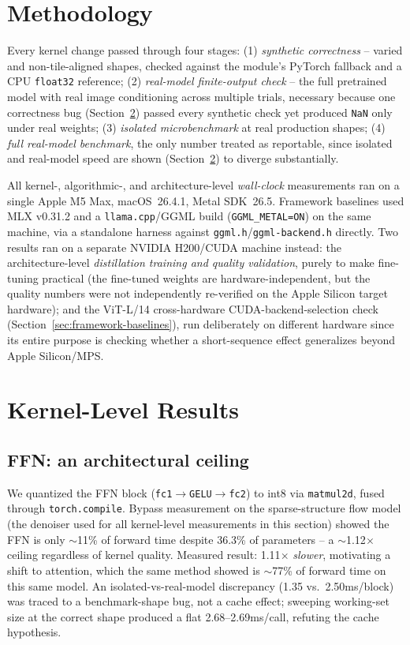 \documentclass{article}
\newcommand{\code}[1]{\texttt{#1}}
\begin{document}
\section{Methodology}

Every kernel change passed through four stages: (1) \emph{synthetic correctness} -- varied and
non-tile-aligned shapes, checked against the module's PyTorch fallback and a CPU \code{float32}
reference; (2) \emph{real-model finite-output check} -- the full pretrained model with real image
conditioning across multiple trials, necessary because one correctness bug
(Section~\ref{sec:ffn}) passed every synthetic check yet produced \code{NaN} only under real
weights; (3) \emph{isolated microbenchmark} at real production shapes; (4) \emph{full real-model
benchmark}, the only number treated as reportable, since isolated and real-model speed are shown
(Section~\ref{sec:ffn}) to diverge substantially.

All kernel-, algorithmic-, and architecture-level \emph{wall-clock} measurements ran on a single
Apple M5 Max, macOS~26.4.1, Metal SDK~26.5. Framework baselines used MLX v0.31.2 and a
\code{llama.cpp}/GGML build (\code{GGML\_METAL=ON}) on the same machine, via a standalone harness
against \code{ggml.h}/\code{ggml-backend.h} directly. Two results ran on a separate NVIDIA
H200/CUDA machine instead: the architecture-level \emph{distillation training and quality
validation}, purely to make fine-tuning practical (the fine-tuned weights are hardware-independent,
but the quality numbers were not independently re-verified on the Apple Silicon target hardware);
and the ViT-L/14 cross-hardware CUDA-backend-selection check
(Section~\ref{sec:framework-baselines}), run deliberately on different hardware since its entire
purpose is checking whether a short-sequence effect generalizes beyond Apple Silicon/MPS.

\section{Kernel-Level Results}
\label{sec:ffn}

\subsection{FFN: an architectural ceiling}
We quantized the FFN block
(\code{fc1}$\to$\code{GELU}$\to$\code{fc2}) to int8 via \code{matmul2d}, fused through
\code{torch.compile}. Bypass measurement on the sparse-structure flow model (the denoiser used for
all kernel-level measurements in this section) showed the FFN is only $\sim$11\% of forward time
despite 36.3\% of parameters -- a $\sim$1.12$\times$ ceiling regardless of kernel quality. Measured
result: 1.11$\times$ \emph{slower}, motivating a shift to attention, which the same method showed
is $\sim$77\% of forward time on this same model. An isolated-vs-real-model discrepancy (1.35 vs.\ 2.50ms/block) was
traced to a benchmark-shape bug, not a cache effect; sweeping working-set size at the correct shape
produced a flat 2.68--2.69ms/call, refuting the cache hypothesis.
\end{document}
